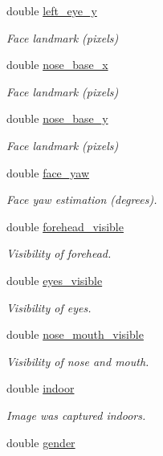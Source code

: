 \begin{DoxyCompactItemize}
double \hyperlink{structjanus__attributes_a4043fc12a8a499682eb19b6443191fd3}{left\+\_\+eye\+\_\+y}
\begin{DoxyCompactList}\small\item\em Face landmark (pixels) \end{DoxyCompactList}\item 
double \hyperlink{structjanus__attributes_abadc5972a69fe84ae6ff9ef71af310dc}{nose\+\_\+base\+\_\+x}
\begin{DoxyCompactList}\small\item\em Face landmark (pixels) \end{DoxyCompactList}\item 
double \hyperlink{structjanus__attributes_a293b37a1a04c09d26b23b8f60f3f1e57}{nose\+\_\+base\+\_\+y}
\begin{DoxyCompactList}\small\item\em Face landmark (pixels) \end{DoxyCompactList}\item 
\hypertarget{structjanus__attributes_ad2d7296926b116e6c5c1ba8a232d3404}{}double \hyperlink{structjanus__attributes_ad2d7296926b116e6c5c1ba8a232d3404}{face\+\_\+yaw}\label{structjanus__attributes_ad2d7296926b116e6c5c1ba8a232d3404}

\begin{DoxyCompactList}\small\item\em Face yaw estimation (degrees). \end{DoxyCompactList}\item 
double \hyperlink{structjanus__attributes_a696065f9d8af60676c04f8bb4d5cdb08}{forehead\+\_\+visible}
\begin{DoxyCompactList}\small\item\em Visibility of forehead. \end{DoxyCompactList}\item 
double \hyperlink{structjanus__attributes_af667c27d0c5f5a8f4af9230367afdbbe}{eyes\+\_\+visible}
\begin{DoxyCompactList}\small\item\em Visibility of eyes. \end{DoxyCompactList}\item 
double \hyperlink{structjanus__attributes_a150d6d79cf9a71cc89086f71c7140691}{nose\+\_\+mouth\+\_\+visible}
\begin{DoxyCompactList}\small\item\em Visibility of nose and mouth. \end{DoxyCompactList}\item 
double \hyperlink{structjanus__attributes_ad52579cc2667fea6e4e86f469a156791}{indoor}
\begin{DoxyCompactList}\small\item\em Image was captured indoors. \end{DoxyCompactList}\item 
\hypertarget{structjanus__attributes_acafb460080a4b9351418cdeff9a1c583}{}double \hyperlink{structjanus__attributes_acafb460080a4b9351418cdeff9a1c583}{gender}\label{structjanus__attributes_acafb460080a4b9351418cdeff9a1c583}


\end{DoxyCompactItemize}
